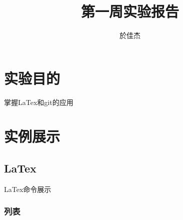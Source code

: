 \documentclass[UTF8]{ctexart}
\begin{document}
\title{第一周实验报告}
\author{於佳杰}
\maketitle
{}
\tableofcontents
\newpage
{}


\section{实验目的}
{\color{red}掌握LaTex和git的应用}
\section{实例展示}

  \subsection{LaTex}
  {\color{blue}LaTex命令展示}



\subsubsection{列表}
\end{document}
